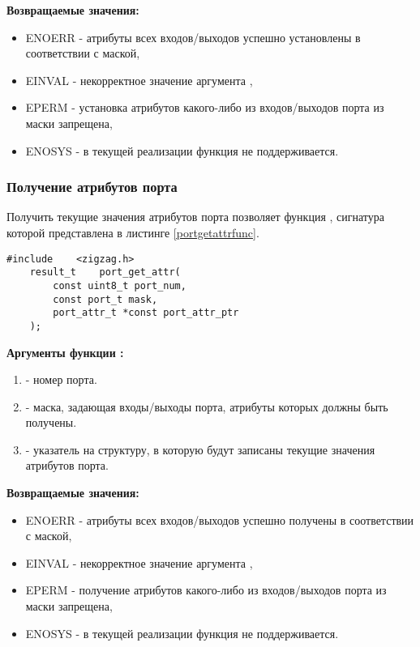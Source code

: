 {\bfseries Возвращаемые значения:}

{\itshape
\begin{itemize}
\item ENOERR - атрибуты всех входов/выходов успешно установлены в соответствии с маской,
\item EINVAL - некорректное значение аргумента ,
\item EPERM - установка атрибутов какого-либо из входов/выходов порта из маски запрещена,
\item ENOSYS - в текущей реализации функция не поддерживается.
\end{itemize}
}

\subsubsection{Получение атрибутов порта}
    Получить текущие значения атрибутов порта позволяет функция ,
сигнатура которой представлена в листинге \ref{portgetattrfunc}.

\begin{lstlisting}[caption=\myarg{port\_get\_attr()} - получение атрибутов порта, label=portgetattrfunc ]
    #include    <zigzag.h>
    result_t    port_get_attr( 
        const uint8_t port_num, 
        const port_t mask, 
        port_attr_t *const port_attr_ptr 
    );
\end{lstlisting}

{\bfseries Аргументы функции :}

{\itshape
\begin{enumerate}
\item {} - номер порта.
\item {} - маска, задающая входы/выходы порта, атрибуты которых должны быть получены.
\item {} - указатель на структуру, в которую будут записаны текущие значения атрибутов порта.
\end{enumerate}
}

{\bfseries Возвращаемые значения:}

{\itshape
\begin{itemize}
\item ENOERR - атрибуты всех входов/выходов успешно получены в соответствии с маской,
\item EINVAL - некорректное значение аргумента ,
\item EPERM - получение атрибутов какого-либо из входов/выходов порта из маски запрещена,
\item ENOSYS - в текущей реализации функция не поддерживается.
\end{itemize}
}


